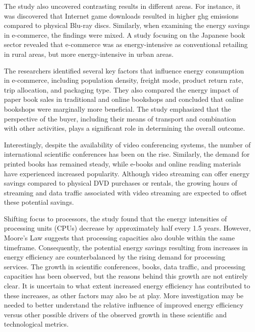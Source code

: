 \documentclass[
  a4paper,  %
  twoside,  %
  bibliography=totoc,
  headsepline,
  cleardoublepage=empty,
  parskip=half,
  draft=false
]{scrbook}
\begin{document}
The study also uncovered contrasting results in different areas. For instance, it was discovered that Internet game downloads resulted in higher \gls{ghg} emissions compared to physical Blu-ray discs\cite{lange2020digitalization}. Similarly, when examining the energy savings in e-commerce, the findings were mixed. A study focusing on the Japanese book sector revealed that e-commerce was as energy-intensive as conventional retailing in rural areas, but more energy-intensive in urban areas.

The researchers identified several key factors that influence energy consumption in e-commerce, including population density, freight mode, product return rate, trip allocation, and packaging type\cite{zaharia2019factors}. They also compared the energy impact of paper book sales in traditional and online bookshops \cite{lange2020digitalization} and concluded that online bookshops were marginally more beneficial. The study emphasized that the perspective of the buyer, including their means of transport and combination with other activities, plays a significant role in determining the overall outcome.

Interestingly, despite the availability of video conferencing systems\cite{lange2020digitalization}, the number of international scientific conferences has been on the rise. Similarly, the demand for printed books has remained steady, while e-books and online reading materials have experienced increased popularity. Although video streaming can offer energy savings compared to physical DVD purchases or rentals, the growing hours of streaming and data traffic associated with video streaming are expected to offset these potential savings.

Shifting focus to processors, the study found that the energy intensities of processing units (CPUs) decrease by approximately half every 1.5 years\cite{lange2020digitalization}. However, Moore's Law\cite{schaller1997moore} suggests that processing capacities also double within the same timeframe. Consequently, the potential energy savings resulting from increases in energy efficiency are counterbalanced by the rising demand for processing services. The growth in scientific conferences, books, data traffic, and processing capacities has been observed, but the reasons behind this growth are not entirely clear. It is uncertain to what extent increased energy efficiency has contributed to these increases, as other factors may also be at play. More investigation may be needed to better understand the relative influence of improved energy efficiency versus other possible drivers of the observed growth in these scientific and technological metrics.
\end{document}
